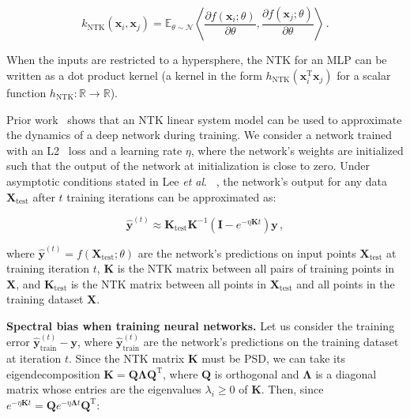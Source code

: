 \begin{equation}
\label{eqn:ntk}
    k_{\mathrm{NTK}}(\mathbf{x}_i, \mathbf{x}_j) = \mathbb E_{\theta \sim \mathcal N} \left\langle \frac{\partial f(\mathbf{x}_i; \theta)}{\partial \theta}, \frac{\partial f(\mathbf{x}_j; \theta)}{\partial \theta} \right\rangle\,.
\end{equation}

When the inputs are restricted to a hypersphere, the NTK for an MLP can be written as a dot product kernel (a kernel in the form $h_{\mathrm{NTK}}(\mathbf x_i^\mathrm{T} \mathbf x_j)$ for a scalar function $h_{\mathrm{NTK}} : \mathbb R \to \mathbb R$).

Prior work~\cite{arora2019finegrained,basri2020frequency,jacot2018neural,lee2019wide} shows that an NTK linear system model can be used to approximate the dynamics of a deep network during training. We consider a network trained with an L2~ loss and a learning rate $\eta$, where the network's weights are initialized such that the output of the network at initialization is close to zero. Under asymptotic conditions stated in Lee \textit{et al}. ~\cite{lee2019wide}, the network's output for any data $\mathbf{X}_{\mathrm{test}}$ after $t$ training iterations can be approximated as:

\begin{equation}
\hat{\mathbf{y}}^{(t)} \approx \mathbf{K}_{\mathrm{test}} \mathbf{K}^{-1}\left( \mathbf{I} - e^{-\eta \mathbf{K} t} \right) \mathbf{y}\,,
\label{eqn:testvals}
\end{equation}

where $\hat{\mathbf{y}}^{(t)}=f(\mathbf{X}_{\mathrm{test}}; \theta)$ are the network's predictions on input points $\mathbf{X}_{\mathrm{test}}$ at training iteration $t$, $\mathbf{K}$ is the NTK matrix between all pairs of training points in $\mathbf{X}$, and $\mathbf{K}_{\mathrm{test}}$ is the NTK matrix between all points in $\mathbf{X}_{\mathrm{test}}$ and all points in the training dataset $\mathbf{X}$.

{\bf Spectral bias when training neural networks.} Let us consider the training error $\mathbf{\hat{y}}^{(t)}_\textrm{train}-\mathbf{y}$, where $\mathbf{\hat{y}}^{(t)}_\textrm{train}$ are the network's predictions on the training dataset at iteration $t$. Since the NTK matrix $\mathbf{K}$ must be PSD, we can take its eigendecomposition $\mathbf{K} = \mathbf{Q} \mathbf{\Lambda} \mathbf{Q}^\mathrm{T}$, where $\mathbf{Q}$ is orthogonal and $\mathbf{\Lambda}$ is a diagonal matrix whose entries are the eigenvalues $\lambda_i \geq 0$ of $\mathbf{K}$.
Then, since $e^{- \eta \mathbf{K} t} = \mathbf{Q} e^{- \eta \mathbf{\Lambda} t} \mathbf{Q}^\mathrm{T}$:

